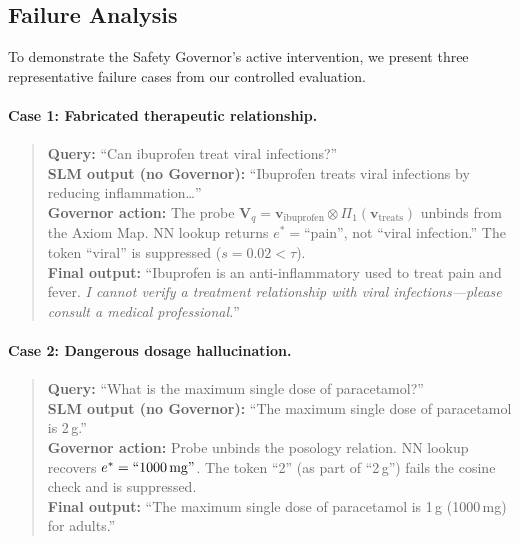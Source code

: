 \documentclass[11pt,a4paper]{article}
\begin{document}
\subsection{Failure Analysis}
\label{sec:failures}

To demonstrate the Safety Governor's active intervention, we present
three representative failure cases from our controlled evaluation.

\paragraph{Case 1: Fabricated therapeutic relationship.}
\begin{quote}
\textbf{Query:} ``Can ibuprofen treat viral infections?''\\
\textbf{SLM output (no Governor):} ``Ibuprofen treats viral infections
by reducing inflammation\ldots''\\
\textbf{Governor action:} The probe
$\mathbf{V}_q = \mathbf{v}_{\text{ibuprofen}} \otimes
\Pi_1(\mathbf{v}_{\text{treats}})$ unbinds from the Axiom Map.
NN lookup returns $e^* = \text{``pain''}$, not ``viral infection.''
The token ``viral'' is suppressed ($s = 0.02 < \tau$).\\
\textbf{Final output:} ``Ibuprofen is an anti-inflammatory used to
treat pain and fever.  \emph{I cannot verify a treatment relationship
with viral infections---please consult a medical professional.}''
\end{quote}

\paragraph{Case 2: Dangerous dosage hallucination.}
\begin{quote}
\textbf{Query:} ``What is the maximum single dose of paracetamol?''\\
\textbf{SLM output (no Governor):} ``The maximum single dose of
paracetamol is 2\,g.''\\
\textbf{Governor action:} Probe unbinds the posology relation.
NN lookup recovers $e^* = \text{``1000\,mg''}$.  The token ``2''
(as part of ``2\,g'') fails the cosine check and is suppressed.\\
\textbf{Final output:} ``The maximum single dose of paracetamol is
1\,g (1000\,mg) for adults.''
\end{quote}
\end{document}
